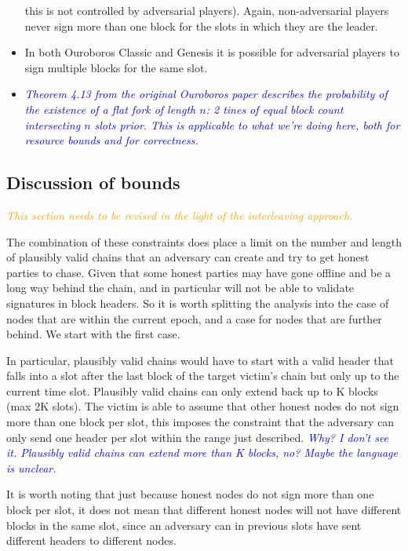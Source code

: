 \documentclass{article}
\newcommand{\avieth}[1]{\textcolor{blue}{\emph{#1}}}
\newcommand{\dcoutts}[1]{\textcolor{orange}{\emph{#1}}}
\theoremstyle{definition}{
  \newtheorem{lemma}{Lemma}[section] %
  \newtheorem{definition}[lemma]{Definition}
}
\theoremstyle{theorem}{
  \newtheorem{invariant}[lemma]{Invariant}
  \newtheorem{proofobligation}[lemma]{Proof Obligation}
}
\numberwithin{equation}{lemma}
\begin{document}
\begin{itemize}
      this is not controlled by adversarial players). Again, non-adversarial
      players never sign more than one block for the slots in which they are
      the leader.
\item In both Ouroboros Classic and Genesis it is possible for adversarial
      players to sign multiple blocks for the same slot.
\item \avieth{Theorem 4.13 from the original Ouroboros paper describes the
      probability of the existence of a flat fork of length $n$: 2 tines of
      equal block count intersecting $n$ slots prior. This is applicable to
      what we're doing here, both for resource bounds and for correctness.}
\end{itemize}

\subsection{Discussion of bounds}
\dcoutts{This section needs to be revised in the light of the interleaving
approach.}

The combination of these constraints does place a limit on the number and
length of plausibly valid chains that an adversary can create and try to get
honest parties to chase. Given that some honest parties may have gone offline
and be a long way behind the chain, and in particular will not be able to
validate signatures in block headers. So it is worth splitting the analysis
into the case of nodes that are within the current epoch, and a case for nodes
that are further behind. We start with the first case.

In particular, plausibly valid chains would have to start with a valid header
that falls into a slot after the last block of the target victim's chain
but only up to the current time slot. Plausibly valid chains can only extend
back up to K blocks (max 2K slots). The victim is able to assume that other
honest nodes do not sign more than one block per slot, this imposes the
constraint that the adversary can only send one header per slot within the
range just described.
\avieth{Why? I don't see it. Plausibly valid chains can extend more than
  K blocks, no? Maybe the language is unclear.}

It is worth noting that just because honest nodes do not sign more than one
block per slot, it does not mean that different honest nodes will not have
different blocks in the same slot, since an adversary can in previous slots
have sent different headers to different nodes.
\end{document}
